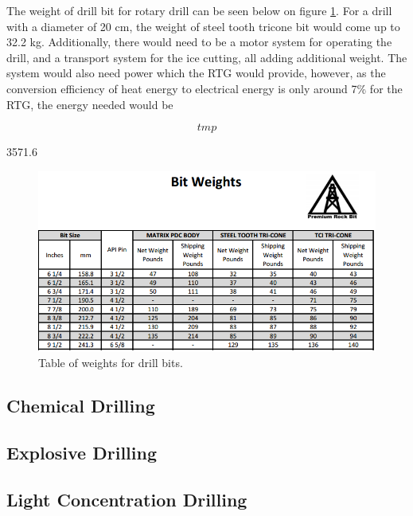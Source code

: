 The weight of drill bit for rotary drill can be seen below on figure \ref{fig:drill_bit_weight}. For a drill with a diameter of 20 cm, the weight of steel tooth tricone bit would come up to 32.2 kg. Additionally, there would need to be a motor system for operating the drill, and a transport system for the ice cutting, all adding additional weight. The system would also need power which the RTG would provide, however, as the conversion efficiency of heat energy to electrical energy is only around 7\% for the RTG, the energy needed would be

\begin{equation}
	tmp
\end{equation}

3571.6

\begin{figure}[htb]
\begin{center}
\includegraphics[scale=0.9]{figures/RCS/drill_bit_weight}
\caption{Table of weights for drill bits.}
\label{fig:drill_bit_weight}
\end{center}
\end{figure}

\subsection{Chemical Drilling}

\subsection{Explosive Drilling}





\subsection{Light Concentration Drilling}

